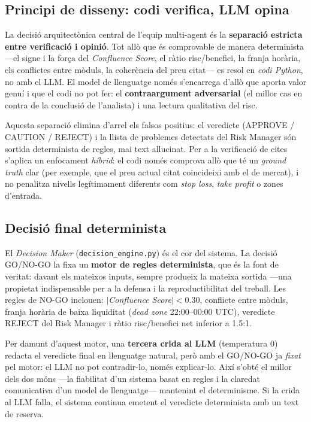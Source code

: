 \documentclass[12pt, a4paper]{report}
\begin{document}
\subsection{Principi de disseny: codi verifica, LLM opina}

La decisió arquitectònica central de l'equip multi-agent és la \textbf{separació estricta entre verificació i opinió}. Tot allò que és comprovable de manera determinista ---el signe i la força del \textit{Confluence Score}, el ràtio risc/benefici, la franja horària, els conflictes entre mòduls, la coherència del preu citat--- es resol en \emph{codi Python}, no amb el LLM. El model de llenguatge només s'encarrega d'allò que aporta valor genuí i que el codi no pot fer: el \textbf{contraargument adversarial} (el millor cas en contra de la conclusió de l'analista) i una lectura qualitativa del risc.

Aquesta separació elimina d'arrel els falsos positius: el veredicte (APPROVE / CAUTION / REJECT) i la llista de problemes detectats del Risk Manager són sortida determinista de regles, mai text al\textperiodcentered{}lucinat. Per a la verificació de cites s'aplica un enfocament \emph{híbrid}: el codi només comprova allò que té un \textit{ground truth} clar (per exemple, que el preu actual citat coincideixi amb el de mercat), i no penalitza nivells legítimament diferents com \textit{stop loss}, \textit{take profit} o zones d'entrada.

\subsection{Decisió final determinista}

El \textit{Decision Maker} (\texttt{decision\_engine.py}) és el cor del sistema. La decisió GO/NO-GO la fixa un \textbf{motor de regles determinista}, que és la font de veritat: davant els mateixos inputs, sempre produeix la mateixa sortida ---una propietat indispensable per a la defensa i la reproductibilitat del treball. Les regles de NO-GO inclouen: $|$\textit{Confluence Score}$| < 0.30$, conflicte entre mòduls, franja horària de baixa liquiditat (\textit{dead zone} 22:00--00:00 UTC), veredicte REJECT del Risk Manager i ràtio risc/benefici net inferior a 1.5:1.

Per damunt d'aquest motor, una \textbf{tercera crida al LLM} (temperatura 0) redacta el veredicte final en llenguatge natural, però amb el GO/NO-GO ja \emph{fixat} pel motor: el LLM no pot contradir-lo, només explicar-lo. Així s'obté el millor dels dos móns ---la fiabilitat d'un sistema basat en regles i la claredat comunicativa d'un model de llenguatge--- mantenint el determinisme. Si la crida al LLM falla, el sistema continua emetent el veredicte determinista amb un text de reserva.
\end{document}

